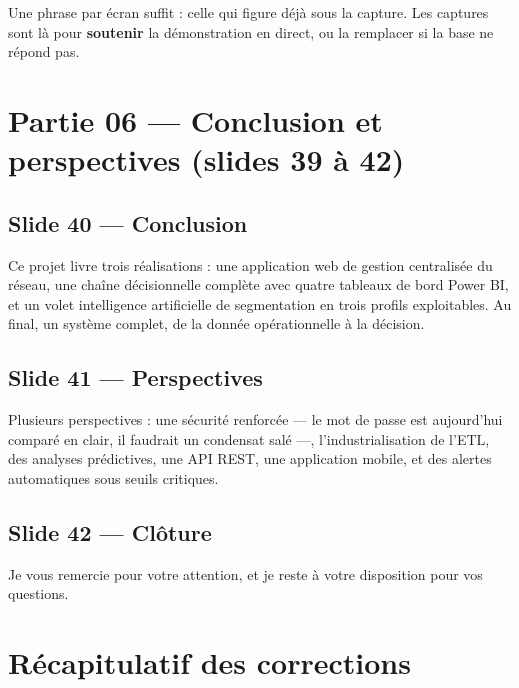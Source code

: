 \documentclass[a4paper,11pt]{article}
\begin{document}
\begin{note}
\small Une phrase par écran suffit : celle qui figure déjà sous la capture. Les
captures sont là pour \textbf{soutenir} la démonstration en direct, ou la
remplacer si la base ne répond pas.
\end{note}

\section*{Partie 06 --- Conclusion et perspectives (slides 39 à 42)}


\subsection*{Slide 40 --- Conclusion}

Ce projet livre trois réalisations : une application web de gestion centralisée
du réseau, une chaîne décisionnelle complète avec quatre tableaux de bord
Power BI, et un volet intelligence artificielle de segmentation en trois profils
exploitables. Au final, un système complet, de la donnée opérationnelle à la
décision.

\subsection*{Slide 41 --- Perspectives}

Plusieurs perspectives : une sécurité renforcée --- le mot de passe est
aujourd'hui comparé en clair, il faudrait un condensat salé ---,
l'industrialisation de l'ETL, des analyses prédictives, une API REST, une
application mobile, et des alertes automatiques sous seuils critiques.

\subsection*{Slide 42 --- Clôture}

Je vous remercie pour votre attention, et je reste à votre disposition pour vos
questions.

\newpage
\section*{Récapitulatif des corrections}
\end{document}
